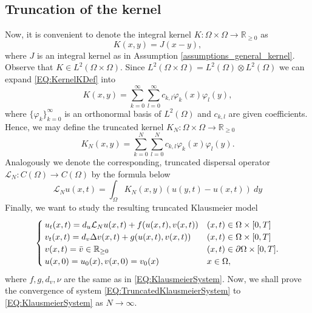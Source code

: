 \documentclass[12pt, a4paper]{article}
\theoremstyle{break}
\theoremstyle{break}
\theoremstyle{break}
\theoremstyle{break}
\theoremstyle{break}
\theoremstyle{break}
\theoremstyle{break}
\begin{document}
\subsection{Truncation of the kernel}
Now, it is convenient to denote the integral kernel $K: \Omega \times \Omega \rightarrow \mathbb{R}_{\geq 0}$ as
\begin{equation}
    \label{EQ:KernelKDef}
    K(x, y) = J(x-y),
\end{equation}
where $J$ is an integral kernel as in Assumption \ref{assumptions_general_kernel}. Observe that $K \in L^2(\Omega \times \Omega)$. Since $L^2(\Omega \times \Omega) = L^2(\Omega) \otimes L^2(\Omega)$ we can expand \eqref{EQ:KernelKDef} into
\begin{equation*}
    K(x, y) = \sum_{k=0}^\infty \sum_{l=0}^\infty c_{k, l} \varphi_k(x) \varphi_l(y),
\end{equation*}
where $\{\varphi_k\}_{k=0}^\infty$ is an orthonormal basis of $L^2(\Omega)$ and $c_{k,l}$ are given coefficients. Hence, we may define the truncated kernel $K_N : \Omega \times \Omega \rightarrow \mathbb{R}_{\geq 0}$
\begin{equation}
    \label{EQ:TruncatedKernelKDef}
    K_N(x, y) = \sum_{k=0}^N \sum_{l=0}^N c_{k, l} \varphi_k(x) \varphi_l(y).
\end{equation}
Analogously we denote the corresponding, truncated dispersal operator $\mathcal{L}_N: C(\Omega) \rightarrow C(\Omega)$ by the formula below
\begin{equation}
    \label{EQ:TruncatedDispersalOperatorDef}
    \mathcal{L}_N u(x, t) = \int_\Omega K_N(x,y) \left(u(y,t) - u(x,t) \right)\:dy
\end{equation}
Finally, we want to study the resulting truncated Klausmeier model
\begin{align}
    \label{EQ:TruncatedKlausmeierSystem}
    \begin{cases}
        u_t(x,t) = d_u\mathcal{L}_N u(x, t) + f(u(x,t), v(x,t)) &(x, t) \in \Omega \times [0, T] \\
        v_t(x,t) = d_v\Delta v(x,t) + g(u(x,t), v(x,t)) &(x, t) \in \Omega \times [0, T] \\
        v(x,t) = \Bar{v} \in \mathbb{R}_{\geq 0} &(x, t) \in \partial\Omega \times [0, T]. \\
        u(x,0) = u_0(x), v(x,0) = v_0(x) &x \in \Omega,
    \end{cases}
\end{align}
where $f, g, d_v, \nu$ are the same as in \eqref{EQ:KlausmeierSystem}. Now, we shall prove the convergence of system \eqref{EQ:TruncatedKlausmeierSystem} to \eqref{EQ:KlausmeierSystem} as $N \rightarrow \infty$.
\end{document}
